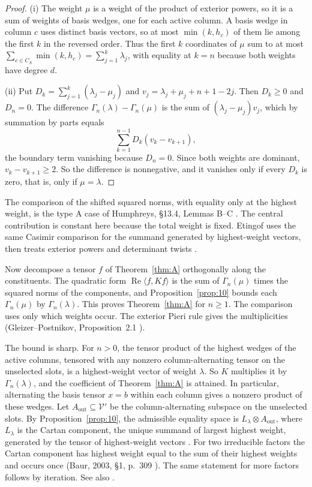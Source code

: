 \documentclass[11pt]{amsart}
\theoremstyle{definition}
\theoremstyle{remark}
\begin{document}
\begin{proof}
(i) The weight \(\mu\) is a weight of the product of exterior powers, so it
is a sum of weights of basis wedges, one for each active column. A basis
wedge in column \(c\) uses distinct basis vectors, so at most
\(\min(k,h_c)\) of them lie among the first \(k\) in the reversed order.
Thus the first \(k\) coordinates of \(\mu\) sum to at most
\(\sum_{c\in C_S}\min(k,h_c)=\sum_{j=1}^k\lambda_j\), with equality at
\(k=n\) because both weights have degree \(d\).

(ii) Put \(D_k=\sum_{j=1}^k(\lambda_j-\mu_j)\) and
\(v_j=\lambda_j+\mu_j+n+1-2j\). Then \(D_k\ge0\) and \(D_n=0\). The
difference \(\Gamma_n(\lambda)-\Gamma_n(\mu)\) is the sum of
\((\lambda_j-\mu_j)v_j\), which by summation by parts equals
\[
\sum_{k=1}^{n-1}D_k(v_k-v_{k+1}),
\]
the boundary term vanishing because \(D_n=0\). Since both weights are
dominant, \(v_k-v_{k+1}\ge2\). So the difference is nonnegative, and it
vanishes only if every \(D_k\) is zero, that is, only if \(\mu=\lambda\).
\end{proof}

The comparison of the shifted squared norms, with equality only at the
highest weight, is the type A case of Humphreys, \S 13.4, Lemmas B--C
\cite{Humphreys}. The central contribution is constant here because the
total weight is fixed. Etingof uses the same Casimir comparison for the
summand generated by highest-weight vectors, then treats exterior powers
and determinant twists \cite[Proposition~27.1 and \S\S 27.2--27.3]{EtingofGL}.

Now decompose a tensor \(f\) of Theorem~\ref{thm:A} orthogonally along the
constituents. The quadratic form
\(\operatorname{Re}\langle f,Kf\rangle\) is the sum of
\(\Gamma_n(\mu)\) times the squared norms of the components, and
Proposition~\ref{prop:10} bounds each \(\Gamma_n(\mu)\) by
\(\Gamma_n(\lambda)\). This proves Theorem~\ref{thm:A} for \(n\ge1\). The
comparison uses only which weights occur. The exterior Pieri rule gives
the multiplicities (Gleizer--Postnikov, Proposition~2.1
\cite{GleizerPostnikov}).

The bound is sharp. For \(n>0\), the tensor product of the highest
wedges of the active columns, tensored with any nonzero column-alternating
tensor on the unselected slots, is a highest-weight vector of weight
\(\lambda\). So \(K\) multiplies it by \(\Gamma_n(\lambda)\), and the
coefficient of Theorem~\ref{thm:A} is attained. In particular,
alternating the basis tensor \(x=b\) within each column gives a nonzero
product of these wedges. Let \(A_{\mathrm{out}}\subseteq\mathcal V'\) be the
column-alternating subspace on the unselected slots. By
Proposition~\ref{prop:10}, the admissible equality space is
\(L_\lambda\otimes A_{\mathrm{out}}\), where \(L_\lambda\) is the Cartan
component, the unique
summand of largest highest weight, generated by the tensor of highest-weight
vectors \cite[\S 1, p.~309]{Baur}. For two irreducible factors the Cartan
component has highest weight equal to the sum of their highest weights and
occurs once (Baur, 2003, \S 1, p.~309 \cite{Baur}). The same statement for
more factors follows by iteration. See also
\cite[Chapter~II, Proposition~3.2, p.~21]{BaurThesis}.
\end{document}
